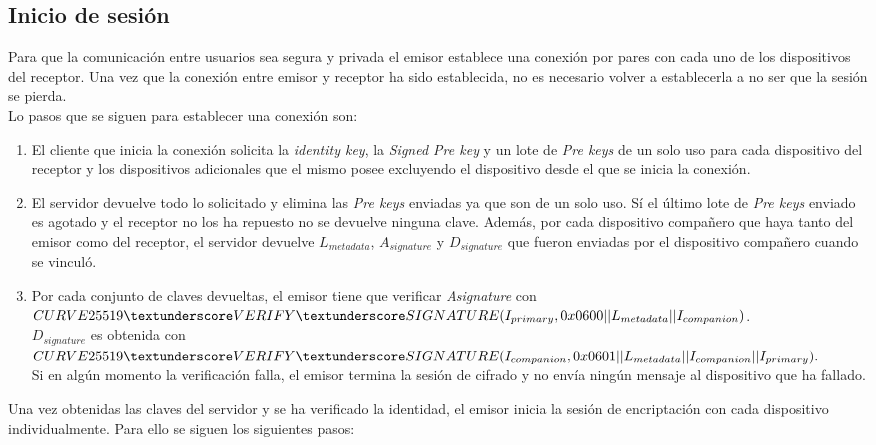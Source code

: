 \subsection{Inicio de sesión}
Para que la comunicación entre usuarios sea segura y privada el emisor establece una conexión por pares con cada uno de los dispositivos del receptor. Una vez que la conexión entre emisor y receptor ha sido establecida, no es necesario volver a establecerla a no ser que la sesión se pierda.\\
Lo pasos que se siguen para establecer una conexión son:
\begin{enumerate}
	\item El cliente que inicia la conexión solicita la \emph{identity key}, la \emph{Signed Pre key} y un lote de \emph{Pre keys} de un solo uso para cada dispositivo del receptor y los dispositivos adicionales que el mismo posee excluyendo el dispositivo desde el que se inicia la conexión. 
	\item El servidor devuelve todo lo solicitado y elimina las \emph{Pre keys} enviadas ya que son de un solo uso. Sí el último lote de \emph{Pre keys} enviado es agotado y el receptor no los ha repuesto no se devuelve ninguna clave. Además, por cada dispositivo compañero que haya tanto del emisor como del receptor, el servidor devuelve $L_{metadata}$, $A_{signature}$ y $D_{signature}$ que fueron enviadas por el dispositivo compañero cuando se vinculó.
	\item Por cada conjunto de claves devueltas, el emisor tiene que verificar \emph{Asignature} con $CURVE25519\textunderscore VERIFY \textunderscore SIGNATURE(I_{primary}, 0x0600\\ || L_{metadata} || I_{companion})$.\\
	$D_{signature}$ es obtenida con $CURVE25519\textunderscore VERIFY\textunderscore SIGNATURE(I_{companion},\\ 0x0601 || L_{metadata} || I_{companion} || I_{primary}).$\\
	Si en algún momento la verificación falla, el emisor termina la sesión de cifrado y no envía ningún mensaje al dispositivo que ha fallado.
\end{enumerate}
Una vez obtenidas las claves del servidor y se ha verificado la identidad, el emisor inicia la sesión de encriptación con cada dispositivo individualmente. Para ello se siguen los siguientes pasos:
